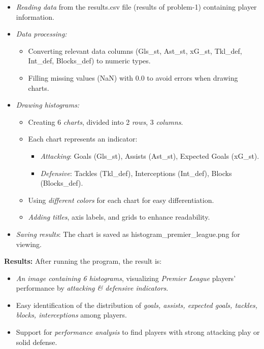 \documentclass[12pt]{article}
\begin{document}
\begin{itemize}
    \item \textit{Reading data} from the results.csv file (results of problem-1) containing player information.
    \item \textit{Data processing:}
    
    \begin{itemize}
        \item Converting relevant data columns (Gls\_st, Ast\_st, xG\_st, Tkl\_def, Int\_def, Blocks\_def) to numeric types.
        \item Filling missing values (NaN) with 0.0 to avoid errors when drawing charts.
    \end{itemize}
    
    \item \textit{Drawing histograms:}
    
    \begin{itemize}
        \item Creating 6 \textit{charts}, divided into 2 \textit{rows}, 3 \textit{columns}.
        \item Each chart represents an indicator:
        
        \begin{itemize}
            \item \textit{Attacking}: Goals (Gls\_st), Assists (Ast\_st), Expected Goals (xG\_st).
            \item \textit{Defensive}: Tackles (Tkl\_def), Interceptions (Int\_def), Blocks (Blocks\_def).
        \end{itemize}
        
        \item Using \textit{different colors} for each chart for easy differentiation.
        \item \textit{Adding titles}, axis labels, and grids to enhance readability.
    \end{itemize}
    
    \item \textit{Saving results}: The chart is saved as histogram\_premier\_league.png for viewing.
\end{itemize}

\textbf{Results:} After running the program, the result is:

\begin{itemize}
    \item \textit{An image containing 6 histograms}, visualizing \textit{Premier League} players' performance by \textit{attacking \& defensive indicators}.
    \item Easy identification of the distribution of \textit{goals, assists, expected goals, tackles, blocks, interceptions} among players.
    \item Support for \textit{performance analysis} to find players with strong attacking play or solid defense.
\end{itemize}
\end{document}
